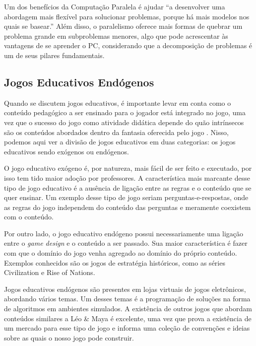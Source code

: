 \documentclass[conference]{IEEEtran}
\begin{document}
Um dos benefícios da Computação Paralela é ajudar ``a desenvolver uma abordagem mais flexível para solucionar problemas, porque há mais modelos nos quais se basear.''\cite{BBC} Além disso, o paralelismo oferece mais formas de quebrar um problema grande em subproblemas menores, algo que pode acrescentar às vantagens de se aprender o PC, considerando que a decomposição de problemas é um de seus pilares fundamentais\cite{BBC}.

\subsection{Jogos Educativos Endógenos}

Quando se discutem jogos educativos, é importante levar em conta como o conteúdo pedagógico a ser ensinado para o jogador está integrado no jogo, uma vez que o sucesso do jogo como atividade didática depende do quão intrínsecos são os conteúdos abordados dentro da fantasia oferecida pelo jogo \cite{habgood_endogenous_2005}. Nisso, podemos aqui ver a divisão de jogos educativos em duas categorias: os jogos educativos sendo exógenos ou endógenos\cite{halverson_what_nodate}.

O jogo educativo exógeno é, por natureza, mais fácil de ser feito e executado, por isso tem tido maior adoção por professores.\cite{halverson_what_nodate} A característica mais marcante desse tipo de jogo educativo é a ausência de ligação entre as regras e o conteúdo que se quer ensinar.  Um exemplo desse tipo de jogo seriam perguntas-e-respostas, onde as regras do jogo independem do conteúdo das perguntas e meramente coexistem com o conteúdo.

Por outro lado, o jogo educativo endógeno possui necessariamente uma ligação entre o \textit{game design} e o conteúdo a ser passado. Sua maior característica é fazer com que o domínio do jogo venha agregado ao domínio do próprio conteúdo. Exemplos conhecidos são os jogos de estratégia históricos, como as séries Civilization e Rise of Nations\cite{halverson_what_nodate}.

Jogos educativos endógenos são presentes em lojas virtuais de jogos eletrônicos, abordando vários temas. Um desses temas é a programação de soluções na forma de algoritmos em ambientes simulados\cite{googleplay}\cite{gogcom}\cite{steam_tag_programming}. A existência de outros jogos que abordam conteúdos similares a Léo \& Maya é excelente, uma vez que prova a existência de um mercado para esse tipo de jogo e informa uma coleção de convenções e ideias sobre as quais o nosso jogo pode construir.
\end{document}
